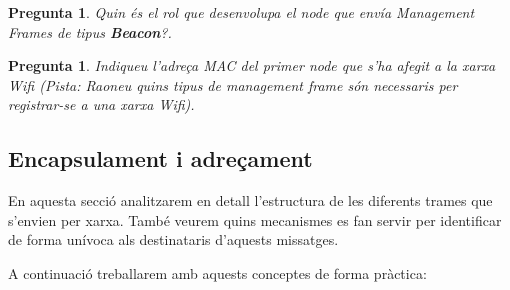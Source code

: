 \documentclass[12pt,a4paper]{article}
\newcounter{exercises}
\newtheorem{exer}[exercises]{Pregunta}
\begin{document}
\begin{enumerate}
\begin{exer} Quin és el rol que desenvolupa el node que envía Management Frames de tipus \textbf{Beacon}?. \end{exer}

\begin{exer} Indiqueu l'adreça MAC del primer node que s'ha afegit a la xarxa Wifi (Pista: Raoneu quins tipus de management frame són necessaris per registrar-se a una xarxa Wifi). \end{exer}


\end{enumerate}

\subsection{Encapsulament i adreçament}
En aquesta secció analitzarem en detall l'estructura de les diferents trames que s'envien per xarxa. També veurem quins mecanismes es fan servir per identificar de forma unívoca als destinataris d'aquests missatges.

A continuació treballarem amb aquests conceptes de forma pràctica:
\end{document}
